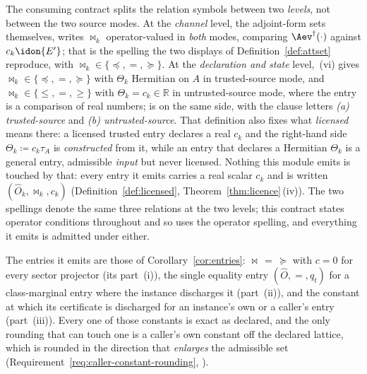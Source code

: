 
\begin{remark}\label{rem:relation-symbols}
The consuming contract splits the relation symbols between two
\emph{levels}, not between the two source modes. At the \emph{channel} level,
the adjoint-form sets themselves,  writes
$\bowtie_k$ operator-valued in \emph{both} modes, comparing
$\Aev^{\dagger}(\cdot)$ against $c_k\idon{E'}$; that is the spelling the two
displays of Definition~\ref{def:attset} reproduce, with
$\bowtie_k\in\{\preceq,=,\succeq\}$. At the \emph{declaration and state}
level, \,(vi) gives $\bowtie_k\in\{\preceq,=,\succeq\}$
with $\Theta_k$ Hermitian on $A$ in trusted-source mode, and
$\bowtie_k\in\{\le,=,\ge\}$ with $\Theta_k=c_k\in\mathbb{R}$ in
untrusted-source mode, where the entry is a comparison of real numbers;
 is on the same side, with the clause letters
\emph{(a) trusted-source} and \emph{(b) untrusted-source}. That definition
also fixes what \emph{licensed} means there: a licensed trusted entry declares
a real $c_k$ and the right-hand side $\Theta_k\coloneqq c_k\tau_A$ is
\emph{constructed} from it, while an entry that declares a Hermitian
$\Theta_k$ is a general entry, admissible \emph{input} but never licensed.
Nothing this module emits is touched by that: every entry it emits carries a
real scalar $c_k$ and is written $(\hat O_k,\bowtie_k,c_k)$
(Definition~\ref{def:licensed}, Theorem~\ref{thm:licence}\,(iv)). The two
spellings denote the same three relations at the two levels; this contract
states operator conditions throughout and so uses the operator spelling, and
everything it emits is admitted under either.

The entries it emits are those of Corollary~\ref{cor:entries}:
$\bowtie\,=\,\succeq$ with $c=0$ for every sector projector (its part~(i)),
the single equality entry $(\hat O,=,q_t)$ for a class-marginal entry where
the instance discharges it (part~(ii)), and the constant at which its
certificate is discharged for an instance's own or a caller's entry
(part~(iii)). Every one of those constants is exact as declared, and the only
rounding that can touch one is a caller's own constant off the declared
lattice, which is rounded in the direction that \emph{enlarges} the
admissible set (Requirement~\ref{req:caller-constant-rounding},
).
\end{remark}
